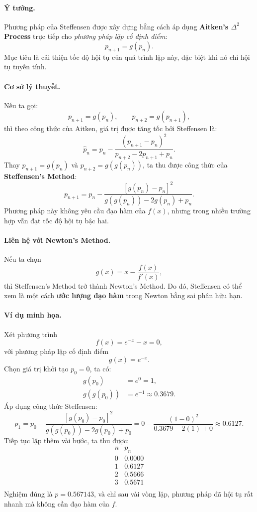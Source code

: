 \paragraph*{Ý tưởng.}
Phương pháp của Steffensen được xây dựng bằng cách 
áp dụng \textbf{Aitken’s $\Delta^2$ Process} trực tiếp cho 
\textit{phương pháp lặp cố định điểm}:
\[
    p_{n+1} = g(p_n).
\]
Mục tiêu là cải thiện tốc độ hội tụ của quá trình lặp này, 
đặc biệt khi nó chỉ hội tụ tuyến tính.

\paragraph*{Cơ sở lý thuyết.}
Nếu ta gọi:
\[
    p_{n+1} = g(p_n), \qquad 
    p_{n+2} = g(p_{n+1}),
\]
thì theo công thức của Aitken, 
giá trị được tăng tốc bởi Steffensen là:
\[
    \hat{p}_n = p_n - 
    \frac{(p_{n+1} - p_n)^2}{p_{n+2} - 2p_{n+1} + p_n}.
\]
Thay $p_{n+1} = g(p_n)$ và $p_{n+2} = g(g(p_n))$, 
ta thu được công thức của \textbf{Steffensen’s Method}:
\[
    p_{n+1} = p_n - 
    \frac{[g(p_n) - p_n]^2}{g(g(p_n)) - 2g(p_n) + p_n}.
\]
Phương pháp này không yêu cầu đạo hàm của $f(x)$, 
nhưng trong nhiều trường hợp vẫn đạt tốc độ hội tụ bậc hai.

\paragraph*{Liên hệ với Newton’s Method.}
Nếu ta chọn
\[
    g(x) = x - \frac{f(x)}{f'(x)},
\]
thì Steffensen’s Method trở thành Newton’s Method.  
Do đó, Steffensen có thể xem là một cách 
\textbf{ước lượng đạo hàm} trong Newton bằng sai phân hữu hạn.

\paragraph*{Ví dụ minh họa.}
Xét phương trình
\[
    f(x) = e^{-x} - x = 0,
\]
với phương pháp lặp cố định điểm
\[
    g(x) = e^{-x}.
\]
Chọn giá trị khởi tạo $p_0 = 0$, ta có:
\[
\begin{aligned}
    g(p_0) &= e^{0} = 1, \\
    g(g(p_0)) &= e^{-1} \approx 0.3679.
\end{aligned}
\]
Áp dụng công thức Steffensen:
\[
    p_1 = p_0 - 
    \frac{[g(p_0) - p_0]^2}{g(g(p_0)) - 2g(p_0) + p_0}
        = 0 - \frac{(1 - 0)^2}{0.3679 - 2(1) + 0}
        \approx 0.6127.
\]
Tiếp tục lặp thêm vài bước, ta thu được:
\[
\begin{array}{c|c}
n & p_n \\ \hline
0 & 0.0000 \\
1 & 0.6127 \\
2 & 0.5666 \\
3 & 0.5671 \\
\end{array}
\]
Nghiệm đúng là $p = 0.567143$, 
và chỉ sau vài vòng lặp, phương pháp đã hội tụ rất nhanh 
mà không cần đạo hàm của $f$.

